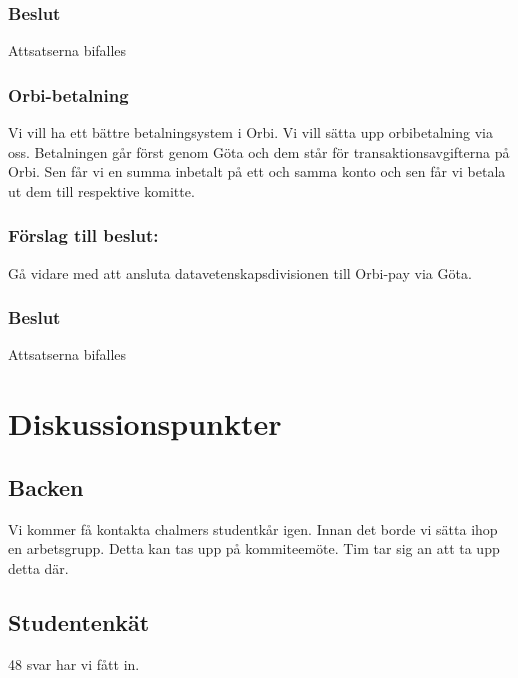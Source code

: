 \documentclass[protokoll]{dvd}
\begin{document}
\subsubsection*{Beslut}
\begin{attsatser}
    \item Attsatserna bifalles
\end{attsatser}

\subsubsection*{Orbi-betalning}
Vi vill ha ett bättre betalningsystem i Orbi. Vi vill sätta upp orbibetalning via oss.
Betalningen går först genom Göta och dem står för transaktionsavgifterna på Orbi. 
Sen får vi en summa inbetalt på ett och samma konto och sen får vi betala ut dem till respektive komitte.

\subsubsection*{Förslag till beslut:}
\begin{attsatser}
    \item Gå vidare med att ansluta datavetenskapsdivisionen till Orbi-pay via Göta.
\end{attsatser}

\subsubsection*{Beslut}
\begin{attsatser}
    \item Attsatserna bifalles
\end{attsatser}


\section{Diskussionspunkter}

\subsection*{Backen}
Vi kommer få kontakta chalmers studentkår igen. Innan det borde vi sätta ihop en arbetsgrupp.
Detta kan tas upp på kommiteemöte. Tim tar sig an att ta upp detta där.

\subsection*{Studentenkät}
48 svar har vi fått in.
\end{document}

